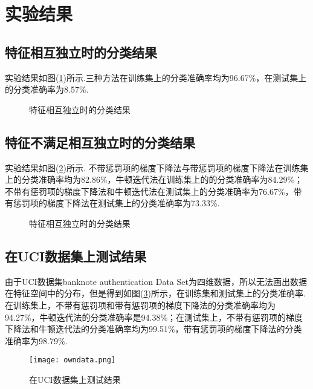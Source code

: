 \documentclass{hitreport}
\begin{document}
%

\section{实验结果}


\subsection{特征相互独立时的分类结果}

实验结果如图(\ref{fig:fig1})所示.三种方法在训练集上的分类准确率均为96.67\%，在测试集上的分类准确率为8.57\%.

\begin{figure}[htb]
	\centering
	\hfill
	\caption{特征相互独立时的分类结果}\label{fig:fig1}
\end{figure}

\subsection{特征不满足相互独立时的分类结果}

实验结果如图(\ref{fig:fig2})所示. 不带惩罚项的梯度下降法与带惩罚项的梯度下降法在训练集上的分类准确率均为82.86\%，牛顿迭代法在训练集上的的分类准确率为84.29\%；不带有惩罚项的梯度下降法和牛顿迭代法在测试集上的分类准确率为76.67\%，带有惩罚项的梯度下降法在测试集上的分类准确率为73.33\%.

\begin{figure}[htb]
	\centering
	\hfill
	\caption{特征相互独立时的分类结果}\label{fig:fig2}
\end{figure}

\subsection{在UCI数据集上测试结果}

由于UCI数据集banknote authentication Data Set为四维数据，所以无法画出数据在特征空间中的分布，但是得到如图(\ref{fig:fig3})所示，在训练集和测试集上的分类准确率. 在训练集上，不带有惩罚项和带有惩罚项的梯度下降法的分类准确率均为94.27\%，牛顿迭代法的分类准确率是94.38\%；在测试集上，不带有惩罚项的梯度下降法和牛顿迭代法的分类准确率均为99.51\%，带有惩罚项的梯度下降法的分类准确率为98.79\%.
\begin{figure}
	\centering
	\texttt{[image: owndata.png]}
	\caption{在UCI数据集上测试结果}\label{fig:fig3}
\end{figure}
\end{document}
